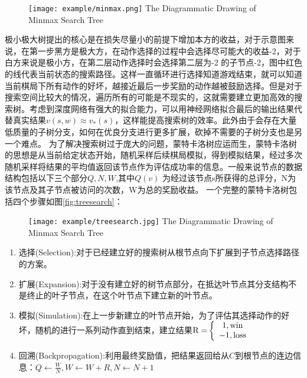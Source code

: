 \begin{figure}[!htp]
	\centering
	\texttt{[image: example/minmax.png]}
	{The Diagrammatic Drawing of Minmax Search Tree}
	\label{极小极大搜索树}
\end{figure}
极小极大树提出的核心是在损失尽量小的前提下增加本方的收益，对于示意图来说，在第一步黑方是极大方，在动作选择的过程中会选择尽可能大的收益-2，对于白方来说是极小方，在第二层动作选择时会选择第二层为-2 的子节点-2，图中红色的线代表当前状态的搜索路径。这样一直循环进行选择知道游戏结束，就可以知道当前棋局下所有动作的好坏，越接近最后一步奖励的动作越被鼓励选择。但是对于搜索空间比较大的情况，遍历所有的可能是不现实的，这就需要建立更加高效的搜索树。考虑到深度网络有强大的拟合能力，可以用神经网络拟合最后的输出结果代替真实结果$v(s,w) \approx {v_*}(s)$，这样能提高搜索树的效率。此外由于会存在大量低质量的子树分支，如何在优良分支进行更多扩展，砍掉不需要的子树分支也是另一个难点。
为了解决搜索树过于庞大的问题，蒙特卡洛树应运而生，蒙特卡洛树的思想是从当前给定状态开始，随机采样后续棋局模拟，得到模拟结果，经过多次随机采样将结果的平均值返回该节点作为评估成功率的信息。一般来说节点的数据结构包括以下三个部分${Q,N,W}$,其中$Q(v)$ 为经过该节点s所获得的总评分，N为该节点及其子节点被访问的次数，W为总的奖励收益。
一个完整的蒙特卡洛树包括四个步骤如图\ref{fig:treesearch}：

\begin{figure}[!htp]
	\centering
	\texttt{[image: example/treesearch.jpg]}
	{The Diagrammatic Drawing of Minmax Search Tree}
	\label{搜索树搜索示意图}
\end{figure}
\begin{enumerate}
	\item 选择(Selection):对于已经建立好的搜索树从根节点向下扩展到子节点选择路径的方案。
	\item 扩展(Expansion):对于没有建立好的树节点部分，在抵达叶节点其分支结构不是终止的叶子节点，在这个叶节点下建立新的叶节点。
	\item 模拟(Simulation):在上一步新建立的叶节点开始，为了评估其选择动作的好坏，随机的进行一系列动作直到结束，建立结果${\rm{R = }}\left\{ {\begin{array}{*{20}{c}}
		{{\rm{1,win}}}\\
		{{\rm{ - 1,loss}}}
		\end{array}} \right.$
	\item 回溯(Backpropagation):利用最终奖励值，把结果返回给从$C$到根节点的连边信息：$Q \leftarrow \frac{W}{N},W \leftarrow W + R,N \leftarrow N + 1$
\end{enumerate}

